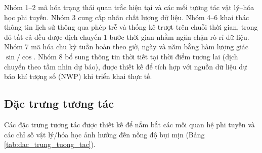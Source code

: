 Nhóm 1--2 mã hóa trạng thái quan trắc hiện tại và các mối tương tác vật lý--hóa học phi tuyến. Nhóm 3 cung cấp nhãn chất lượng dữ liệu. Nhóm 4--6 khai thác thông tin lịch sử thông qua phép trễ và thống kê trượt trên chuỗi thời gian, trong đó tất cả đều được dịch chuyển 1 bước thời gian nhằm ngăn chặn rò rỉ dữ liệu. Nhóm 7 mã hóa chu kỳ tuần hoàn theo giờ, ngày và năm bằng hàm lượng giác $\sin/\cos$. Nhóm 8 bổ sung thông tin thời tiết tại thời điểm tương lai (dịch chuyển theo tầm nhìn dự báo), được thiết kế để tích hợp với nguồn dữ liệu dự báo khí tượng số (NWP) khi triển khai thực tế.

\subsection{Đặc trưng tương tác}

Các đặc trưng tương tác được thiết kế để nắm bắt các mối quan hệ phi tuyến và các chỉ số vật lý/hóa học ảnh hưởng đến nồng độ bụi mịn (Bảng \ref{tab:dac_trung_tuong_tac}).

